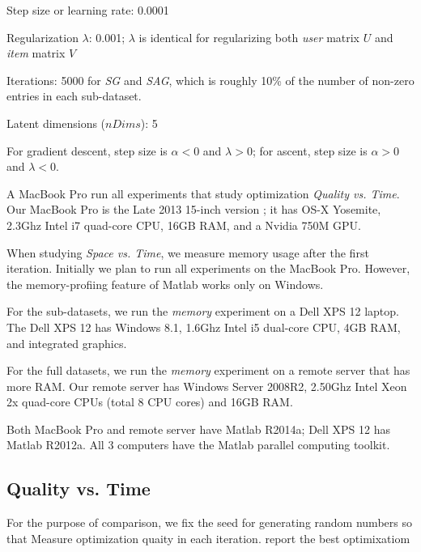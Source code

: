 \begin{sloppy}
\begin{compactitem}
\item Step size or learning rate: 0.0001
\item Regularization $\lambda$: 0.001; $\lambda$ is identical for regularizing both \emph{user} matrix $U$ and \emph{item} matrix $V$
\item Iterations: 5000 for \emph{SG} and \emph{SAG}, which is roughly 10\% of the number of non-zero entries in each sub-dataset.
\item Latent dimensions ($nDims$): 5 
\end{compactitem}
\end{sloppy}

For gradient descent, step size is $\alpha < 0$ and $\lambda > 0$;
for ascent, step size is $\alpha > 0$ and $\lambda < 0$.


A MacBook Pro run all experiments that study optimization \emph{Quality vs. Time}.
Our MacBook Pro is the Late 2013 15-inch version \cite{macbookprolo}; it has OS-X Yosemite, 2.3Ghz Intel i7 quad-core CPU, 16GB RAM, and a Nvidia 750M GPU.

When studying \emph{Space vs. Time}, we measure memory usage after the first iteration.  
Initially we plan to run all experiments on the MacBook Pro.
However, the memory-profiing feature of Matlab works only on Windows.  

For the sub-datasets, we run the \emph{memory} experiment on a Dell XPS 12 \cite{dellxps12} laptop.
The Dell XPS 12 has Windows 8.1, 1.6Ghz Intel i5 dual-core CPU, 4GB RAM, and integrated graphics.  

For the full datasets, we run the \emph{memory} experiment on a remote server that has more RAM.
Our remote server has Windows Server 2008R2, 2.50Ghz Intel Xeon 2x quad-core CPUs (total 8 CPU cores) and 16GB RAM.

Both MacBook Pro and remote server have Matlab R2014a; Dell XPS 12 has Matlab R2012a.
All 3 computers have the Matlab parallel computing toolkit.



\subsection{Quality vs. Time}
For the purpose of comparison, we fix the seed for generating random numbers so that 
Measure optimization quaity in each iteration. report the best optimixatiom 

